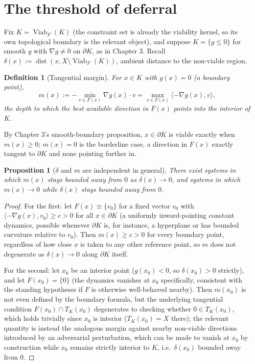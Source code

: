 \documentclass[11pt]{report}
\newtheorem{proposition}{Proposition}[chapter]
\newtheorem{definition}{Definition}[chapter]
\begin{document}
\section*{The threshold of deferral}

Fix $K = \operatorname{Viab}_F(K)$ (the constraint set is already the
viability kernel, so its own topological boundary is the relevant
object), and suppose $K = \{g \leq 0\}$ for smooth $g$ with $\nabla g
\neq 0$ on $\partial K$, as in Chapter 3. Recall
$\delta(x) := \operatorname{dist}(x, X \setminus \operatorname{Viab}_F(K))$,
ambient distance to the non-viable region.

\begin{definition}[Tangential margin]
For $x \in K$ with $g(x) = 0$ (a boundary point),
\[
m(x) := -\min_{v \in F(x)} \nabla g(x) \cdot v = \max_{v \in F(x)} \langle -\nabla g(x), v \rangle,
\]
the depth to which the best available direction in $F(x)$ points into
the interior of $K$.
\end{definition}

By Chapter 3's smooth-boundary proposition, $x \in \partial K$ is
viable exactly when $m(x) \geq 0$; $m(x) = 0$ is the borderline case, a
direction in $F(x)$ exactly tangent to $\partial K$ and none pointing
further in.

\begin{proposition}[$\delta$ and $m$ are independent in general]
There exist systems in which $m(x)$ stays bounded away from $0$ as
$\delta(x) \to 0$, and systems in which $m(x) \to 0$ while $\delta(x)$
stays bounded away from $0$.
\end{proposition}
\begin{proof}
For the first: let $F(x) \equiv \{v_0\}$ for a fixed vector $v_0$ with
$\langle -\nabla g(x), v_0 \rangle \geq c > 0$ for all $x \in \partial K$
(a uniformly inward-pointing constant dynamics, possible whenever
$\partial K$ is, for instance, a hyperplane or has bounded curvature
relative to $v_0$). Then $m(x) \geq c > 0$ for every boundary point,
regardless of how close $x$ is taken to any other reference point, so
$m$ does not degenerate as $\delta(x) \to 0$ along $\partial K$ itself.

For the second: let $x_0$ be an interior point ($g(x_0) < 0$, so
$\delta(x_0) > 0$ strictly), and let $F(x_0) = \{0\}$ (the dynamics
vanishes at $x_0$ specifically, consistent with the standing
hypotheses if $F$ is otherwise well-behaved nearby). Then
$m(x_0)$ is not even defined by the boundary formula, but the
underlying tangential condition $F(x_0) \cap T_K(x_0)$ degenerates to
checking whether $0 \in T_{K}(x_0)$, which holds trivially since
$x_0$ is interior ($T_K(x_0) = X$ there); the relevant quantity is
instead the analogous margin against nearby non-viable directions
introduced by an adversarial perturbation, which can be made to vanish
at $x_0$ by construction while $x_0$ remains strictly interior to $K$,
i.e.\ $\delta(x_0)$ bounded away from $0$.
\end{proof}
\end{document}
